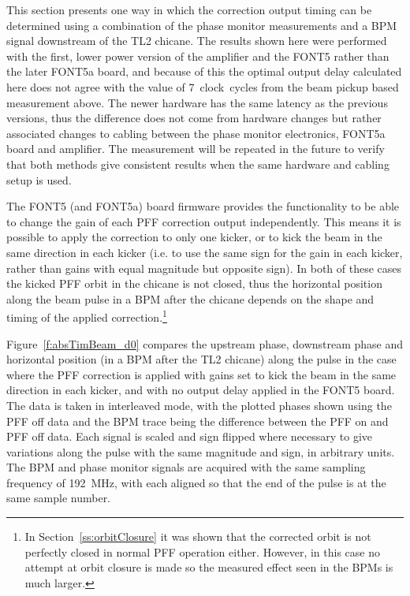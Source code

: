 This section presents one way in which the correction output timing can be determined using a combination of the phase monitor measurements and a BPM signal downstream of the TL2 chicane. The results shown here were performed with the first, lower power version of the amplifier and the FONT5 rather than the later FONT5a board, and because of this the optimal output delay calculated here does not agree with the value of 7~clock~cycles from the beam pickup based measurement above. The newer hardware has the same latency as the previous versions, thus the difference does not come from hardware changes but rather associated changes to cabling between the phase monitor electronics, FONT5a board and amplifier. The measurement will be repeated in the future to verify that both methods give consistent results when the same hardware and cabling setup is used.

The FONT5 (and FONT5a) board firmware provides the functionality to be able to change the gain of each PFF correction output independently. This means it is possible to apply the correction to only one kicker, or to kick the beam in the same direction in each kicker (i.e. to use the same sign for the gain in each kicker, rather than gains with equal magnitude but opposite sign). In both of these cases the kicked PFF orbit in the chicane is not closed, thus the horizontal position along the beam pulse in a BPM after the chicane depends on the shape and timing of the applied correction.\footnote{In Section~\ref{ss:orbitClosure} it was shown that the corrected orbit is not perfectly closed in normal PFF operation either. However, in this case no attempt at orbit closure is made so the measured effect seen in the BPMs is much larger.}

Figure~\ref{f:absTimBeam_d0} compares the upstream phase, downstream phase and horizontal position (in a BPM after the TL2 chicane) along the pulse in the case where the PFF correction is applied with gains set to kick the beam in the same direction in each kicker, and with no output delay applied in the FONT5 board. The data is taken in interleaved mode, with the plotted phases shown using the PFF off data and the BPM trace being the difference between the PFF on and PFF off data. Each signal is scaled and sign flipped where necessary to give variations along the pulse with the same magnitude and sign, in arbitrary units. The BPM and phase monitor signals are acquired with the same sampling frequency of 192~MHz, with each aligned so that the end of the pulse is at the same sample number. 

